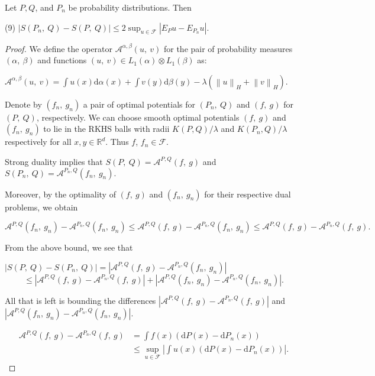 	\begin{prop}
		Let $P, Q$, and $P_{n}$ be probability distributions.
		Then
		\begin{center}
			(9)   $|S(P_{n},\displaystyle \ Q)-S(P,\ Q)|\leq 2\sup_{u\in \mathcal{F}}|E_{P}u-E_{P_n}u|.$
		\end{center}
	\end{prop}
	
	\begin{proof}
		
		We define the operator $\mathcal{A}^{\alpha,\beta}(u,\ v)$ for the pair of probability measures $(\alpha,\ \beta)$ and functions $(u,\ v)\in L_{1}(\alpha)\otimes L_{1}(\beta)$ as:
		
		$\displaystyle \mathcal{A}^{\alpha,\beta}(u,\ v)=\int u(x)\mathrm{d}\alpha(x)+\int v(y)\mathrm{d}\beta(y)-\lambda(\left\|u\right\|_H+\left\|v\right\|_H).$
		
		Denote by $(f_{n},\ g_{n})$ a pair of optimal potentials for $(P_{n},\ Q)$ and $(f,\ g)$ for $(P,\ Q)$, respectively. We can choose smooth optimal potentials $(f,\ g)$ and $(f_{n},\ g_{n})$ to lie in the RKHS balls with radii $K(P,Q)/\lambda$ and $K(P_n,Q)/\lambda$ respectively for all $x, y\in \mathbb{R}^{d}.$ Thus $f$, $f_n\in \mathcal{F}$.
		
		Strong duality implies that $S(P,\ Q)=\mathcal{A}^{P,Q}(f,\ g)$ and $S(P_{n},\ Q)=\mathcal{A}^{P_{n},Q}(f_{n},\ g_{n}).$
		
		Moreover, by the optimality of $(f,\ g)$ and $(f_{n},\ g_{n})$ for their respective dual problems, we obtain
		
		$$\mathcal{A}^{P,Q}(f_{n},\ g_{n})-\mathcal{A}^{P_{n},Q}(f_{n},\ g_{n})\leq \mathcal{A}^{P,Q}(f,\ g)-\mathcal{A}^{P_{n},Q}(f_{n},\ g_{n})\leq \mathcal{A}^{P,Q}(f,\ g)-\mathcal{A}^{P_{n},Q}(f,\ g).$$
		
		From the above bound, we see that
		
		$|S(P,\ Q)-S(P_{n},\ Q)|=|\mathcal{A}^{P,Q}(f,\ g)-\mathcal{A}^{P_{n},Q}(f_{n},\ g_{n})|$
		$$
		\leq|\mathcal{A}^{P,Q}(f,\ g)-\mathcal{A}^{P_{n},Q}(f,\ g)|+|\mathcal{A}^{P,Q}(f_{n},\ g_{n})-\mathcal{A}^{P_{n},Q}(f_{n},\ g_{n})|.
		$$
		
		All that is left is bounding the differences $|\mathcal{A}^{P,Q}(f,\ g)-\mathcal{A}^{P_{n},Q}(f,\ g)|$ and $|\mathcal{A}^{P,Q}(f_{n},\ g_{n})- \mathcal{A}^{P_{n},Q}(f_{n},\ g_{n})|.$
		
		\begin{align*}
			\mathcal{A}^{P,Q}(f,\ g)-\mathcal{A}^{P_{n},Q}(f,\ g) &=\int f(x)(\mathrm{d}P(x)-\mathrm{d}P_{n}(x)) \\
			&\leq\sup_{u\in \mathcal{F}}|\int u(x)(\mathrm{d}P(x)-\mathrm{d}P_{n}(x))|.
		\end{align*}
		

\end{proof}
